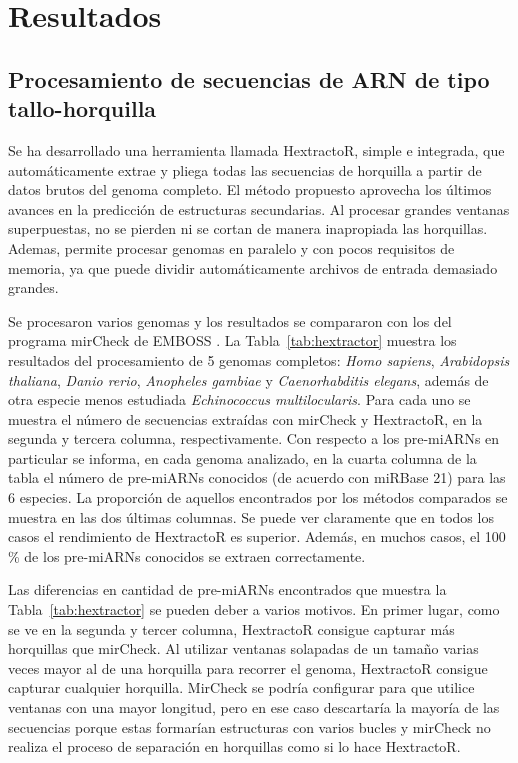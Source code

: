 \chapter{Resultados} \label{sec:results}


\section{Procesamiento de secuencias de ARN de tipo tallo-horquilla}

Se ha desarrollado una herramienta llamada HextractoR, simple e integrada, que automáticamente extrae y pliega todas las secuencias de horquilla a partir de
datos brutos del genoma completo. El método propuesto aprovecha los últimos avances en la predicción de estructuras secundarias. Al procesar grandes
ventanas superpuestas, no se pierden ni se cortan de manera inapropiada las horquillas. Ademas, permite procesar genomas en paralelo y con pocos requisitos de memoria,
ya que puede dividir automáticamente archivos de entrada demasiado grandes.

Se procesaron varios genomas y los resultados se compararon con los del programa mirCheck de EMBOSS \citep{olson2002emboss}. La Tabla~\ref{tab:hextractor}
muestra los resultados del procesamiento de 5 genomas completos: \textit{Homo sapiens}, \textit{Arabidopsis thaliana}, \textit{Danio rerio}, \textit{Anopheles
gambiae} y \textit{Caenorhabditis elegans}, además de otra especie menos estudiada \textit{Echinococcus multilocularis}. Para cada uno se muestra el número de
secuencias extraídas con mirCheck y HextractoR, en la segunda y tercera columna, respectivamente. Con respecto a los pre-miARNs en particular se informa, en
cada genoma analizado, en la cuarta columna de la tabla el número de pre-miARNs conocidos (de acuerdo con miRBase 21) para las 6 especies. La proporción de
aquellos encontrados por los métodos comparados se muestra en las dos últimas columnas. Se puede ver claramente que en todos los casos el rendimiento de
HextractoR es superior. Además, en muchos casos, el 100 \% de los pre-miARNs conocidos se extraen correctamente.

Las diferencias en cantidad de pre-miARNs encontrados que muestra la Tabla~\ref{tab:hextractor} se pueden deber a varios motivos. En primer lugar, como se ve en
la segunda y tercer columna, HextractoR consigue capturar más horquillas que mirCheck. Al utilizar ventanas solapadas de un tamaño varias veces mayor al de
una horquilla para recorrer el genoma, HextractoR consigue capturar cualquier horquilla. MirCheck se podría configurar para que utilice ventanas con una mayor
longitud, pero en ese caso descartaría la mayoría de las secuencias porque estas formarían estructuras con varios bucles y mirCheck no realiza el proceso de
separación en horquillas como si lo hace HextractoR.

